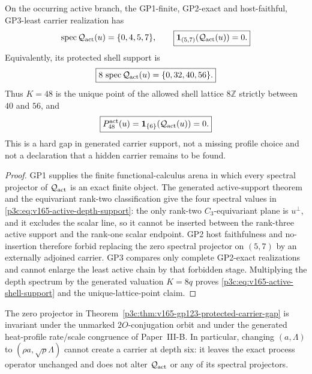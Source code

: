 \documentclass[12pt,a4paper]{article}
\begin{document}
\begin{theorem}
\label{p3c:thm:v165-gp123-protected-carrier-gap}
On the occurring active branch, the GP1-finite, GP2-exact and host-faithful,
GP3-least carrier realization has
\begin{equation}
 \label{p3c:eq:v165-active-depth-support}
 \operatorname{spec}\mathcal Q_{\rm act}(u)=\{0,4,5,7\},
 \qquad
 \boxed{\mathbf1_{(5,7)}(\mathcal Q_{\rm act}(u))=0.}
\end{equation}
Equivalently, its protected shell support is
\begin{equation}
 \label{p3c:eq:v165-active-shell-support}
 \boxed{8\,\operatorname{spec}\mathcal Q_{\rm act}(u)
 =\{0,32,40,56\}.}
\end{equation}
Thus \(K=48\) is the unique point of the allowed shell lattice
\(8\mathbb Z\) strictly between \(40\) and \(56\), and
\begin{equation}
 \label{p3c:eq:v165-k48-projector-zero}
 \boxed{P_{48}^{\rm act}(u)
 =\mathbf1_{\{6\}}(\mathcal Q_{\rm act}(u))=0.}
\end{equation}
This is a hard gap in generated carrier support, not a missing profile
choice and not a declaration that a hidden carrier remains to be found.
\end{theorem}

\begin{proof}
GP1 supplies the finite functional-calculus arena in which every spectral
projector of \(\mathcal Q_{\rm act}\) is an exact finite object.  The generated
active-support theorem and the equivariant rank-two classification give the
four spectral values in \eqref{p3c:eq:v165-active-depth-support}: the only
rank-two \(C_3\)-equivariant plane is \(u^\perp\), and it excludes the scalar
line, so it cannot be inserted between the rank-three active support and the
rank-one scalar endpoint.  GP2 host faithfulness and no-insertion therefore
forbid replacing the zero spectral projector on \((5,7)\) by an externally
adjoined carrier.  GP3 compares only complete GP2-exact realizations and
cannot enlarge the least active chain by that forbidden stage.  Multiplying
the depth spectrum by the generated valuation \(K=8q\) proves
\eqref{p3c:eq:v165-active-shell-support} and the unique-lattice-point claim.
\end{proof}

\begin{corollary}
\label{p3c:cor:v165-carrier-gap-profile-invariance}
The zero projector in
Theorem~\ref{p3c:thm:v165-gp123-protected-carrier-gap} is invariant under
the unmarked \(2O\)-conjugation orbit and under the generated heat-profile
rate/scale congruence of Paper~III-B.  In particular, changing
\((a,\Lambda)\) to \((\rho a,\sqrt\rho\Lambda)\) cannot create a carrier at
depth six: it leaves the exact process operator unchanged and does not alter
\(\mathcal Q_{\rm act}\) or any of its spectral projectors.
\end{corollary}
\end{document}
